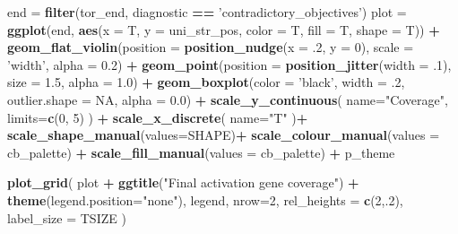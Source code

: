 \documentclass[]{book}
\newenvironment{Shaded}{\begin{snugshade}}{\end{snugshade}}
\newcommand{\DataTypeTok}[1]{\textcolor[rgb]{0.13,0.29,0.53}{#1}}
\newcommand{\DecValTok}[1]{\textcolor[rgb]{0.00,0.00,0.81}{#1}}
\newcommand{\FloatTok}[1]{\textcolor[rgb]{0.00,0.00,0.81}{#1}}
\newcommand{\KeywordTok}[1]{\textcolor[rgb]{0.13,0.29,0.53}{\textbf{#1}}}
\newcommand{\NormalTok}[1]{#1}
\newcommand{\OperatorTok}[1]{\textcolor[rgb]{0.81,0.36,0.00}{\textbf{#1}}}
\newcommand{\OtherTok}[1]{\textcolor[rgb]{0.56,0.35,0.01}{#1}}
\newcommand{\StringTok}[1]{\textcolor[rgb]{0.31,0.60,0.02}{#1}}
\begin{document}
\begin{Shaded}
\begin{Highlighting}[]
\NormalTok{end =}\StringTok{ }\KeywordTok{filter}\NormalTok{(tor_end, diagnostic }\OperatorTok{==}\StringTok{ 'contradictory_objectives'}\NormalTok{)}
\NormalTok{plot =}\StringTok{ }\KeywordTok{ggplot}\NormalTok{(end, }\KeywordTok{aes}\NormalTok{(}\DataTypeTok{x =}\NormalTok{ T, }\DataTypeTok{y =}\NormalTok{ uni_str_pos, }\DataTypeTok{color =}\NormalTok{ T, }\DataTypeTok{fill =}\NormalTok{ T, }\DataTypeTok{shape =}\NormalTok{ T)) }\OperatorTok{+}
\StringTok{  }\KeywordTok{geom_flat_violin}\NormalTok{(}\DataTypeTok{position =} \KeywordTok{position_nudge}\NormalTok{(}\DataTypeTok{x =} \FloatTok{.2}\NormalTok{, }\DataTypeTok{y =} \DecValTok{0}\NormalTok{), }\DataTypeTok{scale =} \StringTok{'width'}\NormalTok{, }\DataTypeTok{alpha =} \FloatTok{0.2}\NormalTok{) }\OperatorTok{+}
\StringTok{  }\KeywordTok{geom_point}\NormalTok{(}\DataTypeTok{position =} \KeywordTok{position_jitter}\NormalTok{(}\DataTypeTok{width =} \FloatTok{.1}\NormalTok{), }\DataTypeTok{size =} \FloatTok{1.5}\NormalTok{, }\DataTypeTok{alpha =} \FloatTok{1.0}\NormalTok{) }\OperatorTok{+}
\StringTok{  }\KeywordTok{geom_boxplot}\NormalTok{(}\DataTypeTok{color =} \StringTok{'black'}\NormalTok{, }\DataTypeTok{width =} \FloatTok{.2}\NormalTok{, }\DataTypeTok{outlier.shape =} \OtherTok{NA}\NormalTok{, }\DataTypeTok{alpha =} \FloatTok{0.0}\NormalTok{) }\OperatorTok{+}
\StringTok{  }\KeywordTok{scale_y_continuous}\NormalTok{(}
    \DataTypeTok{name=}\StringTok{"Coverage"}\NormalTok{,}
    \DataTypeTok{limits=}\KeywordTok{c}\NormalTok{(}\DecValTok{0}\NormalTok{, }\DecValTok{5}\NormalTok{)}
\NormalTok{  ) }\OperatorTok{+}
\StringTok{  }\KeywordTok{scale_x_discrete}\NormalTok{(}
    \DataTypeTok{name=}\StringTok{"T"}
\NormalTok{  )}\OperatorTok{+}
\StringTok{  }\KeywordTok{scale_shape_manual}\NormalTok{(}\DataTypeTok{values=}\NormalTok{SHAPE)}\OperatorTok{+}
\StringTok{  }\KeywordTok{scale_colour_manual}\NormalTok{(}\DataTypeTok{values =}\NormalTok{ cb_palette) }\OperatorTok{+}
\StringTok{  }\KeywordTok{scale_fill_manual}\NormalTok{(}\DataTypeTok{values =}\NormalTok{ cb_palette) }\OperatorTok{+}
\StringTok{  }\NormalTok{p_theme}

\KeywordTok{plot_grid}\NormalTok{(}
\NormalTok{  plot }\OperatorTok{+}
\StringTok{    }\KeywordTok{ggtitle}\NormalTok{(}\StringTok{"Final activation gene coverage"}\NormalTok{) }\OperatorTok{+}
\StringTok{    }\KeywordTok{theme}\NormalTok{(}\DataTypeTok{legend.position=}\StringTok{"none"}\NormalTok{),}
\NormalTok{  legend,}
  \DataTypeTok{nrow=}\DecValTok{2}\NormalTok{,}
  \DataTypeTok{rel_heights =} \KeywordTok{c}\NormalTok{(}\DecValTok{2}\NormalTok{,.}\DecValTok{2}\NormalTok{),}
  \DataTypeTok{label_size =}\NormalTok{ TSIZE}
\NormalTok{)}
\end{Highlighting}
\end{Shaded}
\end{document}
